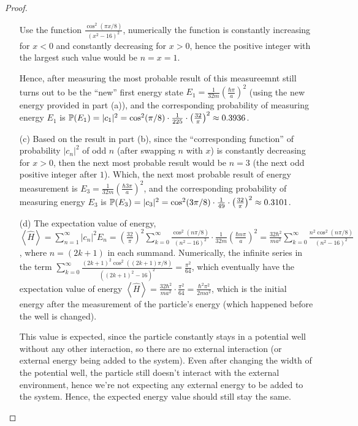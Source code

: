\documentclass{article}
\begin{document}
\begin{proof}
\begin{itemize}
        Use the function $\frac{\cos^2(\pi x/8)}{(x^2-16)^2}$, numerically the function is constantly increasing for $x<0$ and constantly decreasing for $x>0$, hence the positive integer with the largest such value would be $n=x=1$. 

        Hence, after measuring the most probable result of this measureemnt still turns out to be the ``new'' first energy state $E_1=\frac{1}{32m}\left(\frac{\hbar\pi}{a}\right)^2$ (using the new energy provided in part (a)), and the corresponding probability of measuring energy $E_1$ is $\mathbb{P}(E_1)=|c_1|^2 = \cos^2(\pi/8)\cdot\frac{1}{225}\cdot\left(\frac{32}{\pi}\right)^2 \approx 0.3936$.

        \hfil

        \item[(c)] Based on the result in part (b), since the ``corresponding function'' of probability $|c_n|^2$ of odd $n$ (after swapping $n$ with $x$) is constantly decreasing for $x>0$, then the next most probable result would be $n=3$ (the next odd positive integer after $1$). Which, the next most probable result of energy measurement is $E_3 = \frac{1}{32m}\left(\frac{\hbar 3\pi}{a}\right)^2$, and the corresponding probability of measuring energy $E_3$ is $\mathbb{P}(E_3)=|c_3|^2=\cos^2(3\pi/8)\cdot\frac{1}{49}\cdot\left(\frac{32}{\pi}\right)^2\approx 0.3101$.
        
        \hfil

        \item[(d)] The expectation value of energy, $\left<\hat{H}\right> = \sum_{n=1}^{\infty}|c_n|^2 E_n = \left(\frac{32}{\pi}\right)^2\sum_{k=0}^{\infty}\frac{\cos^2(n\pi/8)}{(n^2-16)^2}\cdot \frac{1}{32m}\left(\frac{\hbar n\pi}{a}\right)^2 = \frac{32\hbar^2}{ma^2}\sum_{k=0}^{\infty}\frac{n^2\cos^2(n\pi/8)}{(n^2-16)^2}$, where $n=(2k+1)$ in each summand. Numerically, the infinite series in the term $\sum_{k=0}^{\infty}\frac{(2k+1)^2\cos^2((2k+1)\pi/8)}{((2k+1)^2-16)^2} = \frac{\pi^2}{64}$, which eventually have the expectation value of energy $\left<\hat{H}\right> = \frac{32\hbar^2}{ma^2}\cdot \frac{\pi^2}{64}=\frac{\hbar^2\pi^2}{2ma^2}$, which is the initial energy after the measurement of the particle's energy (which happened before the well is changed).
        
        This value is expected, since the particle constantly stays in a potential well without any other interaction, so there are no external interaction (or external energy being added to the system). Even after changing the width of the potential well, the particle still doesn't interact with the external environment, hence we're not expecting any external energy to be added to the system. Hence, the expected energy value should still stay the same.
   \end{itemize}
\end{proof}

\newpage
\end{document}
